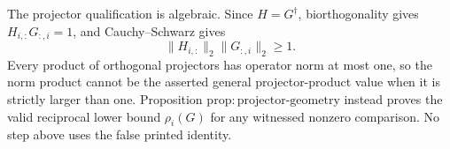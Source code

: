 The projector qualification is algebraic.  Since \(H=G^{\dagger}\), biorthogonality gives \(H_{i,:}G_{:,i}=1\), and Cauchy--Schwarz gives
\[
 \|H_{i,:}\|_2\|G_{:,i}\|_2\ge1.
\]
Every product of orthogonal projectors has operator norm at most one, so the norm product cannot be the asserted general projector-product value when it is strictly larger than one.  Proposition \(\mathrm{prop{:}projector\mbox{-}geometry}\) instead proves the valid reciprocal lower bound \(\rho_i(G)\) for any witnessed nonzero comparison.  No step above uses the false printed identity.
